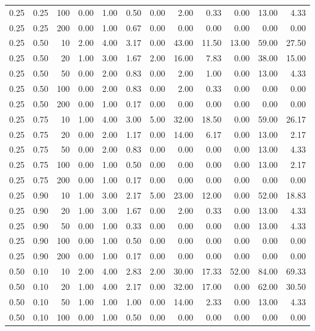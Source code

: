 \documentclass{bmstu}
\begin{document}
\begin{longtable}{|r|r|r|r|r|r|r|r|r|r|r|r|}
0.25 & 0.25 & 100 & 0.00 & 1.00 & 0.50 & 0.00 & 2.00 & 0.33 & 0.00 & 13.00 & 4.33  \\
0.25 & 0.25 & 200 & 0.00 & 1.00 & 0.67 & 0.00 & 0.00 & 0.00 & 0.00 & 0.00 & 0.00  \\
\hline
0.25 & 0.50 & 10 & 2.00 & 4.00 & 3.17 & 0.00 & 43.00 & 11.50 & 13.00 & 59.00 & 27.50  \\
0.25 & 0.50 & 20 & 1.00 & 3.00 & 1.67 & 2.00 & 16.00 & 7.83 & 0.00 & 38.00 & 15.00  \\
0.25 & 0.50 & 50 & 0.00 & 2.00 & 0.83 & 0.00 & 2.00 & 1.00 & 0.00 & 13.00 & 4.33  \\
0.25 & 0.50 & 100 & 0.00 & 2.00 & 0.83 & 0.00 & 2.00 & 0.33 & 0.00 & 0.00 & 0.00  \\
0.25 & 0.50 & 200 & 0.00 & 1.00 & 0.17 & 0.00 & 0.00 & 0.00 & 0.00 & 0.00 & 0.00  \\
\hline
0.25 & 0.75 & 10 & 1.00 & 4.00 & 3.00 & 5.00 & 32.00 & 18.50 & 0.00 & 59.00 & 26.17  \\
0.25 & 0.75 & 20 & 0.00 & 2.00 & 1.17 & 0.00 & 14.00 & 6.17 & 0.00 & 13.00 & 2.17  \\
0.25 & 0.75 & 50 & 0.00 & 2.00 & 0.83 & 0.00 & 0.00 & 0.00 & 0.00 & 13.00 & 4.33  \\
0.25 & 0.75 & 100 & 0.00 & 1.00 & 0.50 & 0.00 & 0.00 & 0.00 & 0.00 & 13.00 & 2.17  \\
0.25 & 0.75 & 200 & 0.00 & 1.00 & 0.17 & 0.00 & 0.00 & 0.00 & 0.00 & 0.00 & 0.00  \\
\hline
0.25 & 0.90 & 10 & 1.00 & 3.00 & 2.17 & 5.00 & 23.00 & 12.00 & 0.00 & 52.00 & 18.83  \\
0.25 & 0.90 & 20 & 1.00 & 3.00 & 1.67 & 0.00 & 2.00 & 0.33 & 0.00 & 13.00 & 4.33  \\
0.25 & 0.90 & 50 & 0.00 & 1.00 & 0.33 & 0.00 & 0.00 & 0.00 & 0.00 & 13.00 & 4.33  \\
0.25 & 0.90 & 100 & 0.00 & 1.00 & 0.50 & 0.00 & 0.00 & 0.00 & 0.00 & 0.00 & 0.00  \\
0.25 & 0.90 & 200 & 0.00 & 1.00 & 0.17 & 0.00 & 0.00 & 0.00 & 0.00 & 0.00 & 0.00  \\
\hline
0.50 & 0.10 & 10 & 2.00 & 4.00 & 2.83 & 2.00 & 30.00 & 17.33 & 52.00 & 84.00 & 69.33  \\
0.50 & 0.10 & 20 & 1.00 & 4.00 & 2.17 & 0.00 & 32.00 & 17.00 & 0.00 & 62.00 & 30.50  \\
0.50 & 0.10 & 50 & 1.00 & 1.00 & 1.00 & 0.00 & 14.00 & 2.33 & 0.00 & 13.00 & 4.33  \\
0.50 & 0.10 & 100 & 0.00 & 1.00 & 0.50 & 0.00 & 0.00 & 0.00 & 0.00 & 0.00 & 0.00  \\

\end{longtable}
\end{document}
